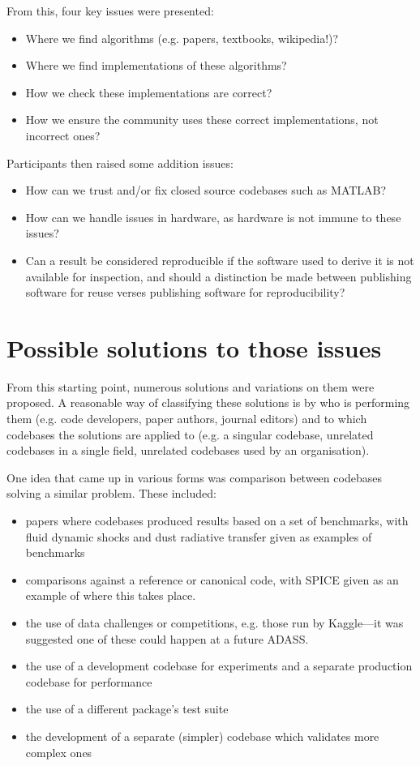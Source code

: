 \documentclass[11pt,twoside]{article}
\begin{document}
From this, four key issues were presented:
\begin{itemize}
  \item Where we find algorithms (e.g. papers, textbooks, wikipedia!)?
  \item Where we find implementations of these algorithms?
  \item How we check these implementations are correct?
  \item How we ensure the community uses these correct implementations, not
    incorrect ones?
\end{itemize}

Participants then raised some addition issues:
\begin{itemize}
  \item How can we trust and/or fix closed source codebases such as MATLAB?
  \item How can we handle issues in hardware, as hardware is not immune to these
    issues?
  \item Can a result be considered reproducible if the software used
    to derive it is not available for inspection, and should a distinction be
    made between publishing software for reuse verses publishing software for
    reproducibility?
\end{itemize}

\section{Possible solutions to those issues}
From this starting point, numerous solutions and variations on them were
proposed. A reasonable way of classifying these solutions is by who is
performing them (e.g. code developers, paper authors, journal editors) and to
which codebases the solutions are applied to (e.g. a singular codebase, unrelated
codebases in a single field, unrelated codebases used by an organisation).

One idea that came up in various forms was comparison between codebases solving
a similar problem. These included:
\begin{itemize}
  \item papers where codebases produced results based on a set of benchmarks, with fluid dynamic shocks and dust radiative transfer given as examples of benchmarks
  \item comparisons against a reference or canonical code, with SPICE
    \citep{1996P&SS...44...65A,2018P&SS..150....9A} given as an
    example of where this takes place.
  \item the use of data challenges or competitions, e.g. those run by Kaggle—it
    was suggested one of these could happen at a future ADASS.
  \item the use of a development codebase for experiments and a separate production
    codebase for performance
  \item the use of a different package's test suite
  \item the development of a separate (simpler) codebase which validates more
    complex ones
\end{itemize}
\end{document}
